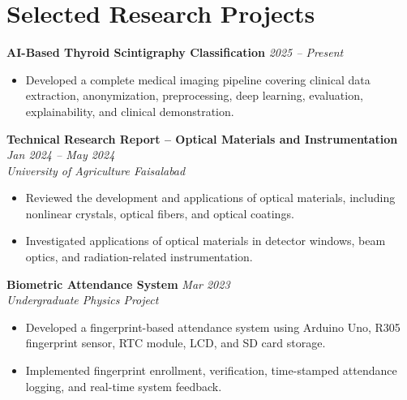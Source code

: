 \documentclass[10.5pt,a4paper]{article}
\begin{document}

\section{Selected Research Projects}

\textbf{AI-Based Thyroid Scintigraphy Classification}
\hfill \textit{2025 -- Present}

\begin{itemize}

    \item Developed a complete medical imaging pipeline covering clinical
    data extraction, anonymization, preprocessing, deep learning,
    evaluation, explainability, and clinical demonstration.

\end{itemize}


\textbf{Technical Research Report -- Optical Materials and Instrumentation}
\hfill \textit{Jan 2024 -- May 2024}\\
\textit{University of Agriculture Faisalabad}

\begin{itemize}

    \item Reviewed the development and applications of optical materials,
    including nonlinear crystals, optical fibers, and optical coatings.

    \item Investigated applications of optical materials in detector
    windows, beam optics, and radiation-related instrumentation.

\end{itemize}


\textbf{Biometric Attendance System}
\hfill \textit{Mar 2023}\\
\textit{Undergraduate Physics Project}

\begin{itemize}

    \item Developed a fingerprint-based attendance system using Arduino
    Uno, R305 fingerprint sensor, RTC module, LCD, and SD card storage.

    \item Implemented fingerprint enrollment, verification, time-stamped
    attendance logging, and real-time system feedback.

\end{itemize}
\end{document}
